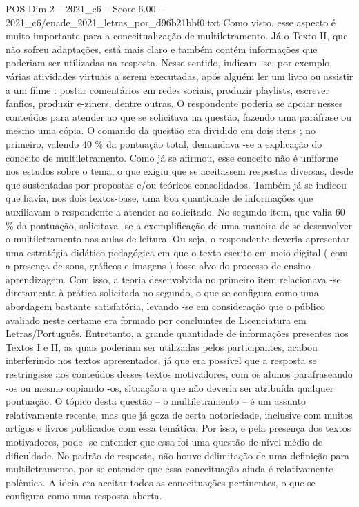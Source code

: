 \begin{textsample}{POS Dim 2 – 2021\_c6 – Score 6.00 – 2021\_c6/enade\_2021\_letras\_por\_d96b21bbf0.txt}
Como visto, esse aspecto é muito importante para a conceitualização de multiletramento.
Já o Texto II, que não sofreu adaptações, está mais claro e também contém informações que poderiam ser utilizadas na resposta.
Nesse sentido, indicam -se, por exemplo, várias atividades virtuais a serem executadas, após alguém ler um livro ou assistir a um filme : postar comentários em redes sociais, produzir playlists, escrever fanfics, produzir e-ziners, dentre outras.
O respondente poderia se apoiar nesses conteúdos para atender ao que se solicitava na questão, fazendo uma paráfrase ou mesmo uma cópia.
O comando da questão era dividido em dois itens ; no primeiro, valendo 40 \% da pontuação total, demandava -se a explicação do conceito de multiletramento.
Como já se afirmou, esse conceito não é uniforme nos estudos sobre o tema, o que exigiu que se aceitassem respostas diversas, desde que sustentadas por propostas e/ou teóricos consolidados.
Também já se indicou que havia, nos dois textos-base, uma boa quantidade de informações que auxiliavam o respondente a atender ao solicitado.
No segundo item, que valia 60 \% da pontuação, solicitava -se a exemplificação de uma maneira de se desenvolver o multiletramento nas aulas de leitura.
Ou seja, o respondente deveria apresentar uma estratégia didático-pedagógica em que o texto escrito em meio digital ( com a presença de sons, gráficos e imagens ) fosse alvo do processo de ensino-aprendizagem.
Com isso, a teoria desenvolvida no primeiro item relacionava -se diretamente à prática solicitada no segundo, o que se configura como uma abordagem bastante satisfatória, levando -se em consideração que o público avaliado neste certame era formado por concluintes de Licenciatura em Letras/Português.
Entretanto, a grande quantidade de informações presentes nos Textos I e II, as quais poderiam ser utilizadas pelos participantes, acabou interferindo nos textos apresentados, já que era possível que a resposta se restringisse aos conteúdos desses textos motivadores, com os alunos parafraseando -os ou mesmo copiando -os, situação a que não deveria ser atribuída qualquer pontuação.
O tópico desta questão – o multiletramento – é um assunto relativamente recente, mas que já goza de certa notoriedade, inclusive com muitos artigos e livros publicados com essa temática.
Por isso, e pela presença dos textos motivadores, pode -se entender que essa foi uma questão de nível médio de dificuldade.
No padrão de resposta, não houve delimitação de uma definição para multiletramento, por se entender que essa conceituação ainda é relativamente polêmica.
A ideia era aceitar todos as conceituações pertinentes, o que se configura como uma resposta aberta.

\end{textsample}
